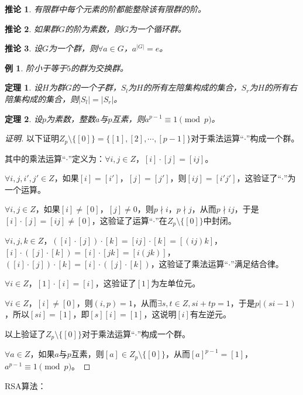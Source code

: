 \documentclass{article}
\newtheorem{Thm}{定理}
\newtheorem*{Example}{例}
\newtheorem{Cor}{推论}
\begin{document}
\begin{CJK*}{UTF8}{gbsn}
\begin{Cor}
有限群中每个元素的阶都能整除该有限群的阶。
\end{Cor}

\begin{Cor}
  如果群$G$的阶为素数，则$G$为一个循环群。
\end{Cor}

\begin{Cor}
  设$G$为一个群，则$\forall a\in G$，$a^{|G|}=e$。
\end{Cor}

\begin{Example}
  阶小于等于$5$的群为交换群。
\end{Example}

\begin{Thm}
  设$H$为群$G$的一个子群，$S_l$为$H$的所有左陪集构成的集合，$S_r$为$H$的所有右陪集构成的集合，则$|S_l|=|S_r|$。
\end{Thm}

\begin{Thm}
  设$p$为素数，整数$a$与$p$互素，则$a^{p-1}\equiv 1 \pmod p$。
\end{Thm}
\begin{proof}[证明]
  以下证明$Z_p\setminus \{[0]\}=\{[1],[2],\cdots,[p-1]\}$对于乘法运算“$\cdot$”构成一个群。

  其中的乘法运算“$\cdot$”定义为：$\forall i,j\in Z$，$[i]\cdot [j]=[ij]$。

  $\forall i,j,i',j'\in Z$，如果$[i]=[i']$，$[j]=[j']$，则$[ij]=[i'j']$，这验证了“$\cdot$”为一个运算。

  $\forall i,j\in Z$，如果$[i]\neq [0]$，$[j]\neq 0$，则$p\nmid i$，$p\nmid j$，从而$p\nmid ij$，于是$[i]\cdot[j]=[ij]\neq [0]$，这验证了运算“$\cdot$”在$Z_p\setminus \{[0]\}$中封闭。

  $\forall i,j,k\in Z$，$([i]\cdot [j])\cdot [k]=[ij]\cdot [k]=[(ij)k]$，$[i]\cdot ([j]\cdot [k])=[i]\cdot [jk]=[i(jk)]$，$([i]\cdot [j])\cdot [k]=[i]\cdot ([j]\cdot [k])$，这验证了乘法运算“$\cdot$”满足结合律。

  $\forall i\in Z$，$[1]\cdot [i] =[i]$，这验证了$[1]$为左单位元。

  $\forall i\in Z$，$[i]\neq [0]$，则$(i,p)=1$，从而$\exists s,t\in Z,si+tp=1$，于是$p|(si-1)$，所以$[si]=[1]$，即$[s][i]=[1]$，这说明$[i]$有左逆元。

  以上验证了$Z_p\setminus \{[0]\}$对于乘法运算“$\cdot$”构成一个群。

  $\forall a\in Z$，如果$a$与$p$互素，则$[a]\in Z_p\setminus \{[0]\}$，从而$[a]^{p-1}=[1]$，$a^{p-1}\equiv 1 \pmod {p}$。
\end{proof}
RSA算法：


\end{CJK*}
\end{document}
